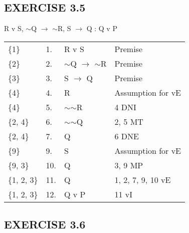 \documentclass[a4paper,12pt]{article}
\newcommand{\mra}{$\rightarrow$ }
\newcommand{\ms}{$\sim$}
\begin{document}
\begin{enumerate}[label=\arabic*,leftmargin=*]
\begin{enumerate}[label=\arabic*.]
            \end{enumerate}
    \end{enumerate}

    \subsection*{EXERCISE 3.5}

    \begin{enumerate}[label=\arabic*,leftmargin=*]

        \begin{minipage}{\textwidth}
        \item R v S, \ms Q \mra \ms R, S \mra Q : Q v P
            \nopagebreak
            \vspace{1em}\\
            \begin{tabular}{l l l l}
                \{1\} & 1. & R v S & Premise\\
                \{2\} & 2. & \ms Q \mra \ms R & Premise\\
                \{3\} & 3. & S \mra Q & Premise\\
                \{4\} & 4. & R & Assumption for vE\\
                \{4\} & 5. & \ms \ms R & 4 DNI\\
                \{2, 4\} & 6. & \ms \ms Q & 2, 5 MT\\
                \{2, 4\} & 7. & Q & 6 DNE\\
                \{9\} & 9. & S & Assumption for vE\\
                \{9, 3\} & 10. & Q & 3, 9 MP\\
                \{1, 2, 3\} & 11. & Q & 1, 2, 7, 9, 10 vE\\
                \{1, 2, 3\} & 12. & Q v P & 11 vI\\
            \end{tabular}
        \end{minipage}

    \end{enumerate}

    \subsection*{EXERCISE 3.6}
\end{document}
